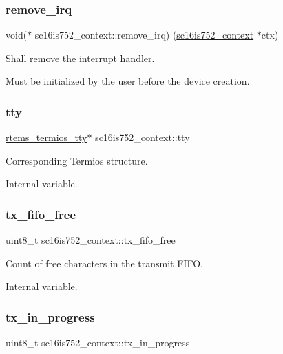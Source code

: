 \subsubsection{\texorpdfstring{remove\_irq}{remove\_irq}}
{\footnotesize\ttfamily void($\ast$ sc16is752\+\_\+context\+::remove\+\_\+irq) (\mbox{\hyperlink{structsc16is752__context}{sc16is752\+\_\+context}} $\ast$ctx)}



Shall remove the interrupt handler. 

Must be initialized by the user before the device creation. \mbox{\label{structsc16is752__context_a609fc83b2964e1975cdbc76079605a98}} 
\subsubsection{\texorpdfstring{tty}{tty}}
{\footnotesize\ttfamily \mbox{\hyperlink{structrtems__termios__tty}{rtems\+\_\+termios\+\_\+tty}}$\ast$ sc16is752\+\_\+context\+::tty}



Corresponding Termios structure. 

Internal variable. \mbox{\label{structsc16is752__context_a8496d94fa7e19cda46888e752550dd75}} 
\subsubsection{\texorpdfstring{tx\_fifo\_free}{tx\_fifo\_free}}
{\footnotesize\ttfamily uint8\+\_\+t sc16is752\+\_\+context\+::tx\+\_\+fifo\+\_\+free}



Count of free characters in the transmit F\+I\+FO. 

Internal variable. \mbox{\label{structsc16is752__context_aa16349778a26d57b2795404769b4693b}} 
\subsubsection{\texorpdfstring{tx\_in\_progress}{tx\_in\_progress}}
{\footnotesize\ttfamily uint8\+\_\+t sc16is752\+\_\+context\+::tx\+\_\+in\+\_\+progress}



